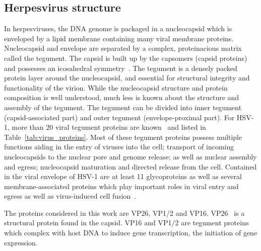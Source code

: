 \pagebreak

\subsection{Herpesvirus structure}
In herpesviruses, the DNA genome is packaged in a nucleocapsid which is enveloped by a lipid membrane containing many viral membrane proteins.
Nucleocapsid and envelope are separated by a complex, proteinacious matrix called the tegument.
The \gls{capsid} is built up by the capsomers (capsid proteins) and possesses an icosahedral symmetry~\cite{bainesHerpesSimplexVirus2011}.
The tegument is a densely packed protein layer around the nucleocapsid, and essential for structural integrity and functionality of the virion.
While the nucleocapsid structure and protein composition is well understood, much less is known about the structure and assembly of the tegument.
The tegument can be divided into inner tegument (capsid-associated part) and outer tegument (envelope-proximal part).
For HSV-1, more than 20 viral tegument proteins are known~\cite{kellyFunctionalRolesTegument2009,maxwellViralProteomics2007} and listed in Table~\ref{tab:virus_proteins}.
Most of these tegument proteins possess multiple functions aiding in the entry of viruses into the cell; transport of incoming nucleocapsids to the nuclear pore and genome release; as well as nuclear assembly and egress; nucleocapsid maturation and directed release from the cell.
Contained in the viral envelope of \gls{HSV}-1 are at least 11 glycoproteins as well as several membrane-associated proteins which play important roles in viral entry and egress as well as virus-induced cell fusion~\cite{reskeUnderstandingHSV1Entry2007,johnsonHerpesvirusesRemodelHost2011}.

The proteins considered in this work are \gls{VP26}, \gls{VP1/2} and \gls{VP16}.
\gls{VP26}~\cite{tangCrystalStructuresMajor2007} is a structural protein found in the capsid.
\gls{VP16} and \gls{VP1/2} are tegument proteins which complex with host DNA to induce gene transcription, the initiation of gene expression.

